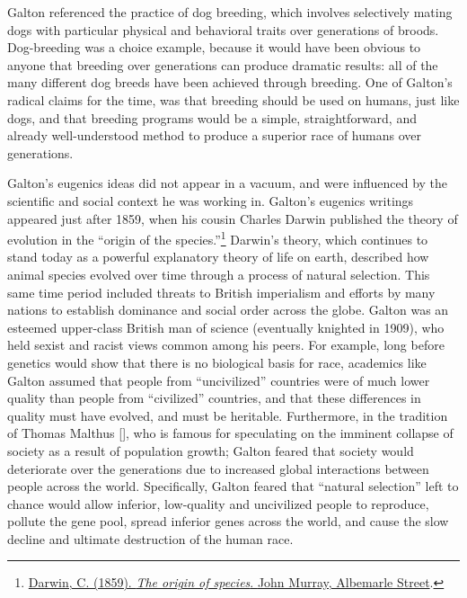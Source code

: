 \documentclass[
  oneside,
  12pt]{crumpbook}
\begin{document}
Galton referenced the practice of dog breeding, which involves selectively mating dogs with particular physical and behavioral traits over generations of broods. Dog-breeding was a choice example, because it would have been obvious to anyone that breeding over generations can produce dramatic results: all of the many different dog breeds have been achieved through breeding. One of Galton's radical claims for the time, was that breeding should be used on humans, just like dogs, and that breeding programs would be a simple, straightforward, and already well-understood method to produce a superior race of humans over generations.

Galton's eugenics ideas did not appear in a vacuum, and were influenced by the scientific and social context he was working in. Galton's eugenics writings appeared just after 1859, when his cousin Charles Darwin published the theory of evolution in the ``origin of the species.''\footnote{\protect\hyperlink{ref-darwinOriginSpecies1859}{Darwin, C. (1859). \emph{The origin of species}. {John Murray, Albemarle Street}}.} Darwin's theory, which continues to stand today as a powerful explanatory theory of life on earth, described how animal species evolved over time through a process of natural selection. This same time period included threats to British imperialism and efforts by many nations to establish dominance and social order across the globe. Galton was an esteemed upper-class British man of science (eventually knighted in 1909), who held sexist and racist views common among his peers. For example, long before genetics would show that there is no biological basis for race, academics like Galton assumed that people from ``uncivilized'' countries were of much lower quality than people from ``civilized'' countries, and that these differences in quality must have evolved, and must be heritable. Furthermore, in the tradition of Thomas Malthus {[}{]}, who is famous for speculating on the imminent collapse of society as a result of population growth; Galton feared that society would deteriorate over the generations due to increased global interactions between people across the world. Specifically, Galton feared that ``natural selection'' left to chance would allow inferior, low-quality and uncivilized people to reproduce, pollute the gene pool, spread inferior genes across the world, and cause the slow decline and ultimate destruction of the human race.
\end{document}
